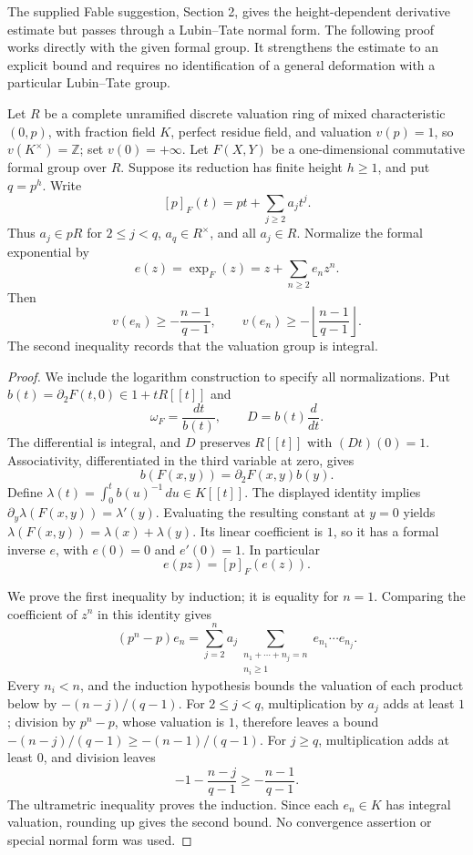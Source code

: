The supplied Fable suggestion, Section 2, gives the height-dependent
derivative estimate but passes through a Lubin--Tate normal form.
The following proof works directly with the given formal group.
It strengthens the estimate to an explicit bound and requires no
identification of a general deformation with a particular
Lubin--Tate group.

\begin{proposition}
Let $R$ be a complete unramified discrete valuation ring of mixed
characteristic $(0,p)$, with fraction field $K$, perfect residue
field, and valuation $v(p)=1$, so $v(K^\times)=\mathbb Z$;
set $v(0)=+\infty$.
Let $F(X,Y)$ be a one-dimensional commutative formal group over
$R$. Suppose its reduction has finite height $h\ge1$, and put
$q=p^h$. Write
\[
 [p]_F(t)=pt+\sum_{j\ge2}a_jt^j.
\]
Thus $a_j\in pR$ for $2\le j<q$, $a_q\in R^\times$, and
all $a_j\in R$. Normalize the formal exponential by
\[
 e(z)=\exp_F(z)=z+\sum_{n\ge2}e_nz^n.
\]
Then
\[
 v(e_n)\ge-\frac{n-1}{q-1},\qquad
 v(e_n)\ge-\left\lfloor\frac{n-1}{q-1}\right\rfloor.
\]
The second inequality records that the valuation group is integral.
\end{proposition}
\begin{proof}
We include the logarithm construction to specify all normalizations.
Put $b(t)=\partial_2F(t,0)\in1+tR[[t]]$ and
\[
 \omega_F=\frac{dt}{b(t)},\qquad D=b(t)\frac{d}{dt}.
\]
The differential is integral, and $D$ preserves $R[[t]]$ with
$(Dt)(0)=1$. Associativity, differentiated in the third variable
at zero, gives
\[
 b(F(x,y))=\partial_2F(x,y)b(y).
\]
Define $\lambda(t)=\int_0^t b(u)^{-1}\,du\in K[[t]]$.
The displayed identity implies
$\partial_y\lambda(F(x,y))=\lambda'(y)$.
Evaluating the resulting constant at $y=0$ yields
$\lambda(F(x,y))=\lambda(x)+\lambda(y)$.
Its linear coefficient is $1$, so it has a formal inverse $e$,
with $e(0)=0$ and $e'(0)=1$. In particular
\[
 e(pz)=[p]_F(e(z)).
\]

We prove the first inequality by induction; it is equality for
$n=1$. Comparing the coefficient of $z^n$ in this identity gives
\[
 (p^n-p)e_n=
 \sum_{j=2}^n a_j
  \sum_{\substack{n_1+\cdots+n_j=n\\n_i\ge1}}
       e_{n_1}\cdots e_{n_j}.
\]
Every $n_i<n$, and the induction hypothesis bounds the valuation
of each product below by $-(n-j)/(q-1)$.
For $2\le j<q$, multiplication by $a_j$ adds at least $1$;
division by $p^n-p$, whose valuation is $1$, therefore leaves
a bound $-(n-j)/(q-1)\ge-(n-1)/(q-1)$.
For $j\ge q$, multiplication adds at least $0$, and division
leaves
\[
 -1-\frac{n-j}{q-1}\ge-\frac{n-1}{q-1}.
\]
The ultrametric inequality proves the induction. Since each
$e_n\in K$ has integral valuation, rounding up gives the second
bound. No convergence assertion or special normal form was used.
\end{proof}

